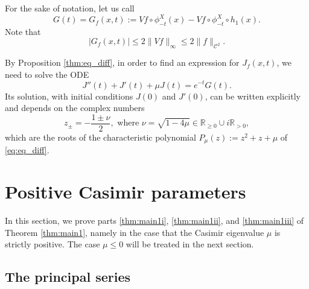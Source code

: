 \documentclass[10pt]{amsart}
\newcommand \R{\mathbb{R}}
\theoremstyle{definition}
\begin{document}
For the sake of notation, let us call
\begin{equation*}
G(t) = G_f(x,t) := Vf \circ \phi^X_{-t}(x) - Vf \circ \phi^X_{-t} \circ h_1(x).
\end{equation*}
Note that
\begin{equation}\label{eq:estimate_G}
|G_f(x,t)|\leq 2 \|Vf\|_\infty \leq 2 \|f\|_{\mathscr{C}^2}.
\end{equation}

By Proposition \ref{thm:eq_diff}, in order to find an expression for $J_f(x,t)$, we need to solve the ODE
\begin{equation}\label{eq:eq_diff}
J''(t)+J'(t)+ \mu J(t) = e^{-t}G(t).
\end{equation}
Its solution, with initial conditions $J(0)$ and $J'(0)$, can be written explicitly and depends on the complex numbers
\[
z_{\pm} = -\frac{1\pm \nu}{2}, \text{\ \ \ where\ \ \ } \nu = \sqrt{1-4\mu} \in \R_{\geq 0} \cup i\R_{>0},
\]
which are the roots of the characteristic polynomial $P_\mu(z):= z^2 + z +\mu$ of \eqref{eq:eq_diff}.

\section{Positive Casimir parameters}\label{section:positive_param}

In this section, we prove parts \eqref{thm:main1i}, \eqref{thm:main1ii}, and \eqref{thm:main1iii} of Theorem \ref{thm:main1}, namely in the case that the Casimir eigenvalue $\mu$ is strictly positive. The case $\mu \leq 0$ will be treated in the next section.

\subsection{The principal series}\label{sec:princ}
\end{document}
